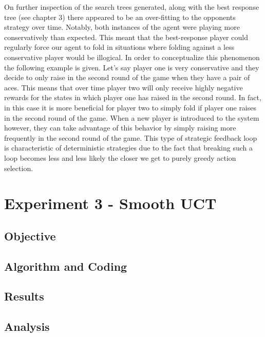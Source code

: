 On further inspection of the search trees generated, along with the best response tree (see chapter 3)
there appeared to be an over-fitting to the opponents strategy over time.
Notably, both instances of the agent were playing more conservatively than expected.
This meant that the best-response player could regularly force our agent to fold in
situations where folding against a less conservative player would be illogical.
In order to conceptualize this phenomenon the following example is given.
Let's say player one is very conservative and they decide to only raise in the second round of the game when they
have a pair of aces.
This means that over time player two will only receive highly negative rewards for the states in
which player one has raised in the second round.
In fact, in this case it is more beneficial for player two to simply fold if player one raises in
the second round of the game.
When a new player is introduced to the system however, they can take advantage of this
behavior by simply raising more frequently in the second round of the game.
This type of strategic feedback loop is characteristic of deterministic strategies due to the
fact that breaking such a loop becomes less and less likely the closer we get to purely greedy action selection.


\section{Experiment 3 - Smooth UCT}\label{sec:experiment3}

\subsection{Objective}\label{subsec:objective3}
\subsection{Algorithm and Coding}\label{subsec:algAndCoding3}
\subsection{Results}\label{subsec:results3}
\subsection{Analysis}\label{subsec:analysis3}

